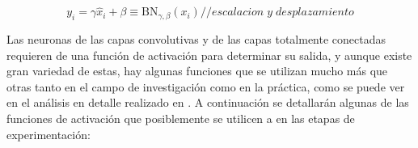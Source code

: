  \begin{equation}\label{formula:bn_scale_and_shift}
 y_{i} = \gamma \widehat{x}_{i}+\beta \equiv \mathrm{B} \mathrm{N}_{\gamma, \beta}\left(x_{i}\right) {// escalacion \; y \; desplazamiento}
 \end{equation}
 
 Las neuronas de las capas convolutivas y de las capas totalmente conectadas requieren de una función de activación para determinar su salida, y aunque existe gran variedad de estas, hay algunas funciones que se utilizan mucho más que otras tanto en el campo de investigación como en la práctica, como se puede ver en el análisis en detalle realizado en \cite{nwankpa2018activation}. A continuación se detallarán algunas de las funciones de activación que posiblemente se utilicen a en las etapas de experimentación:

